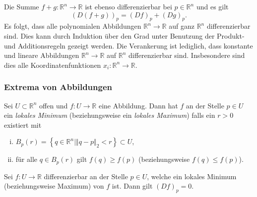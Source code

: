\documentclass[../main.tex]{subfiles}
\begin{document}
\begin{remark}
  Die Summe $f + g \colon \mathbb{R}^n \to \mathbb{R}$ 
  ist ebenso differenzierbar bei $p \in \mathbb{R}^n$ 
  und es gilt
  \[
    {(D(f+g))}_p = {(Df)}_p + {(Dg)}_p.
  \]
  Es folgt, dass alle polynomialen Abbildungen
  $\mathbb{R}^n \to \mathbb{R}$ auf ganz
  $\mathbb{R}^n$ differenzierbar sind.
  Dies kann durch Induktion über den Grad unter
  Benutzung der Produkt- und Additionsregeln
  gezeigt werden.
  Die Verankerung ist lediglich, dass
  konstante und lineare Abbildungen 
  $\mathbb{R}^n \to \mathbb{R}$ auf $\mathbb{R}^n$ 
  differenzierbar sind.
  Insbesondere sind dies alle Koordinatenfunktionen
  $x_i \colon \mathbb{R}^n \to \mathbb{R}$.
\end{remark}

\subsubsection*{Extrema von Abbildungen}
\begin{definition}
Sei $U \subset \mathbb{R}^n$ offen und
$f \colon U \to \mathbb{R}$ eine Abbildung.
Dann hat $f$ an der Stelle $p \in U$ 
ein \emph{lokales Minimum} (beziehungsweise
ein \emph{lokales Maximum})
falls ein $r > 0$ existiert mit
\begin{enumerate}[(i)]
  \item $B_p(r) = \left\{q \in \mathbb{R}^n \mid 
    \Vert q - p \Vert_2 < r\right\} \subset U$,
  \item für alle $q \in B_p(r)$ gilt
    $f(q) \geq f(p)$ (beziehungsweise $f(q) \leq f(p)$).
\end{enumerate}
\end{definition}

\begin{proposition*}
  Sei $f \colon U \to \mathbb{R}$ differenzierbar
  an der Stelle $p \in U$, welche ein lokales
  Minimum (beziehungsweise Maximum) von $f$ ist.
  Dann gilt ${(Df)}_p = 0$.
\end{proposition*}

\end{document}
